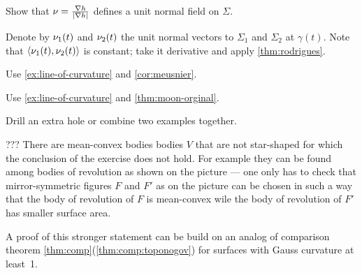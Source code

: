 





 Show that $\nu=\tfrac{\nabla h}{|\nabla h|}$ defines a unit normal field on $\Sigma$.





  Denote by $\nu_1(t)$ and $\nu_2(t)$ the unit normal vectors to $\Sigma_1$ and $\Sigma_2$ at $\gamma(t)$.
Note that $\langle \nu_1(t),\nu_2(t)\rangle$ is constant; take it derivative and apply \ref{thm:rodrigues}.


 Use \ref{ex:line-of-curvature} and \ref{cor:meusnier}.



 Use \ref{ex:line-of-curvature} and \ref{thm:moon-orginal}.

 Drill an extra hole or combine two examples together.





 ???
There are mean-convex bodies bodies $V$ that are not star-shaped for which the conclusion of the exercise does not hold.
For example they can be found among bodies of revolution as shown on the picture --- one only has to check that mirror-symmetric figures $F$ and $F'$ as on the picture can be chosen in such a way that the body of revolution of $F$ is mean-convex wile the body of revolution of $F'$ has smaller surface area. 

A proof of this stronger statement can be build on an analog of comparison theorem \ref{thm:comp}(\ref{thm:comp:toponogov}) for surfaces with Gauss curvature at least~1.

